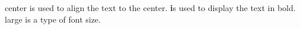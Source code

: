 \documentclass[12pt, letterpaper]{article}
\begin{document}
{center} is used to align the text to the center.
\textbf is used to display the text in bold.
{large} is a type of font size.
\end{document}
